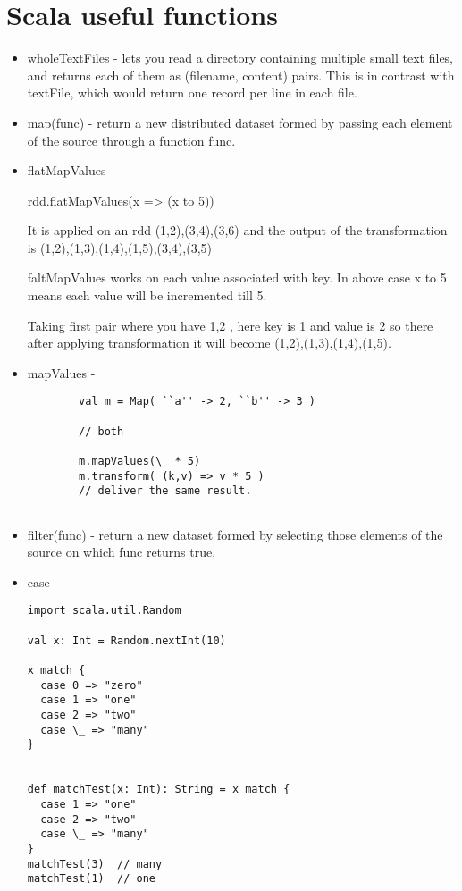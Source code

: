 \documentclass[paper=a4, fontsize=11pt]{scrartcl}
\numberwithin{equation}{section}		%
\numberwithin{figure}{section}			%
\numberwithin{table}{section}				%
\begin{document}
\section{Scala useful functions}
\begin{itemize}
	\item wholeTextFiles - lets you read a directory containing multiple small text files, and returns each of them as (filename, content) pairs. This is in contrast with textFile, which would return one record per line in each file.
	\item map(func) - return a new distributed dataset formed by passing each element of the source through a function func.  
	\item flatMapValues -

		rdd.flatMapValues(x => (x to 5))

		It is applied on an rdd {(1,2),(3,4),(3,6)} and the output of the transformation is {(1,2),(1,3),(1,4),(1,5),(3,4),(3,5)}

		faltMapValues works on each value associated with key. In above case {x to 5} means each value will be incremented till 5.

		Taking first pair where you have {1,2} , here key is 1 and value is 2 so there after applying transformation it will become (1,2),(1,3),(1,4),(1,5).
	\item mapValues - 
		\begin{lstlisting}
		val m = Map( ``a'' -> 2, ``b'' -> 3 )

		// both

		m.mapValues(\_ * 5)
		m.transform( (k,v) => v * 5 )
		// deliver the same result.


		\end{lstlisting}
	\item filter(func) -  return a new dataset formed by selecting those elements of the source on which func returns true. 
	\item case -
		\begin{lstlisting}
import scala.util.Random

val x: Int = Random.nextInt(10)

x match {
  case 0 => "zero"
  case 1 => "one"
  case 2 => "two"
  case \_ => "many"
}


def matchTest(x: Int): String = x match {
  case 1 => "one"
  case 2 => "two"
  case \_ => "many"
}
matchTest(3)  // many
matchTest(1)  // one



\end{lstlisting}
\end{itemize}
\end{document}
